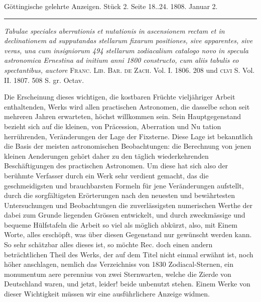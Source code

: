 \clearpage
{}
\hypertarget{native-494-lower}{}\label{native-494-lower}
\begin{center}
\small Göttingische gelehrte Anzeigen. Stück 2. Seite 18..24. 1808. Januar 2.\\[3pt]
\rule{.72\linewidth}{.3pt}
\end{center}

\emph{Tabulae speciales aberrationis et nutationis in ascensionem rectam et in declinationem ad supputandas stellarum fixarum positiones, sive apparentes, sive veras, una cum insigniorum 494 stellarum zodiacalium catalogo novo in specula astronomica Ernestina ad initium anni \textup{1800} constructo, cum aliis tabulis eo spectantibus, auctore} \textsc{Franc. Lib. Bar. de Zach}. Vol. I. 1806. 208 und \textsc{clvi} S. Vol. II. 1807. 508 S. gr. Octav.

Die Erscheinung dieses wichtigen, die kostbaren Früchte vieljähriger Arbeit enthaltenden, Werks wird allen practischen Astronomen, die dasselbe schon seit mehreren Jahren erwarteten, höchst willkommen sein. Sein Hauptgegenstand bezieht sich auf die kleinen, von Präcession, Aberration und Nu%
%
tation herrührenden, Veränderungen der Lage der Fixsterne. Diese Lage ist bekanntlich die Basis der meisten astronomischen Beobachtungen: die Berechnung von jenen kleinen Aenderungen gehört daher zu den täglich wiederkehrenden Beschäftigungen des practischen Astronomen. Um diese hat sich also der berühmte Verfasser durch ein Werk sehr verdient gemacht, das die geschmeidigsten und brauchbarsten Formeln für jene Veränderungen aufstellt, durch die sorgfältigsten Erörterungen nach den neuesten und bewährtesten Untersuchungen und Beobachtungen die zuverlässigsten numerischen Werthe der dabei zum Grunde liegenden Grössen entwickelt, und durch zweckmässige und bequeme Hülfstafeln die Arbeit so viel als möglich abkürzt, also, mit Einem Worte, alles erschöpft, was über diesen Gegenstand nur gewünscht werden kann. So sehr schätzbar alles dieses ist, so möchte Rec. doch einen andern beträchtlichen Theil des Werks, der auf dem Titel nicht einmal erwähnt ist, noch höher anschlagen, nemlich das Verzeichniss von 1830 Zodiacal-Sternen, ein monumentum aere perennius von zwei Sternwarten, welche die Zierde von Deutschland waren, und jetzt, leider! beide unbenutzt stehen. Einem Werke von dieser Wichtigkeit müssen wir eine ausführlichere Anzeige widmen.

